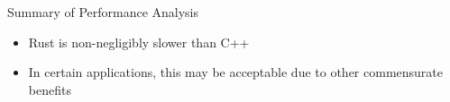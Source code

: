 \documentclass[10pt,aspectratio=169]{beamer}
\begin{document}

\begin{frame}{Summary of Performance Analysis}
    \begin{itemize}
        \item Rust is non-negligibly slower than C++
        \item In certain applications, this may be acceptable due to other commensurate benefits
    \end{itemize}
\end{frame}
\end{document}
